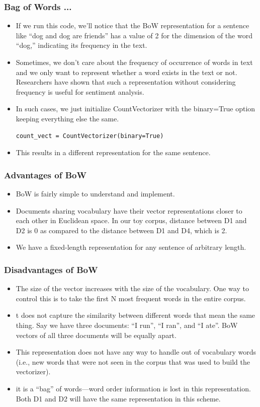 \documentclass{beamer}
\begin{document}
\begin{frame}[fragile]
\frametitle{Bag of Words ... }
\begin{itemize}
\item If we run this code, we’ll notice that the BoW representation for a sentence like “dog and dog are friends” has a value of 2 for the dimension of the word “dog,” indicating its frequency in the text. \pause
\item Sometimes, we don’t care about the frequency of occurrence of words in text and we only want to represent whether a word exists in the text or not. Researchers have shown that such a representation without considering frequency is useful for sentiment analysis. \pause
\item In such cases, we just initialize CountVectorizer with the binary=True option keeping everything else the same. 
\begin{verbatim}
count_vect = CountVectorizer(binary=True)
\end{verbatim}
\item This results in a different representation for the same sentence. \pause
\end{itemize}
\end{frame}

\begin{frame}
\frametitle{Advantages of BoW}
\begin{itemize}
\item BoW is fairly simple to understand and implement.
\item Documents sharing vocabulary have their vector representations closer to each other in Euclidean space. In our toy corpus, distance between D1 and D2 is 0 as compared to the distance between D1 and D4, which is 2.  
\item We have a fixed-length representation for any sentence of arbitrary length.
\end{itemize}
\end{frame}

\begin{frame}
\frametitle{Disadvantages of BoW}
\begin{itemize}
\item The size of the vector increases with the size of the vocabulary. One way to control this is to take the first N most frequent words in the entire corpus.
\item t does not capture the similarity between different words that mean the same thing. Say we have three documents: “I run”, “I ran”, and “I ate”. BoW vectors of all three documents will be equally apart.
\item This representation does not have any way to handle out of vocabulary words (i.e., new words that were not seen in the corpus that was used to build the vectorizer).
\item it is a “bag” of words—word order information is lost in this representation.  Both D1 and D2 will have the same representation in this scheme.
\end{itemize}
\end{frame}
\end{document}
